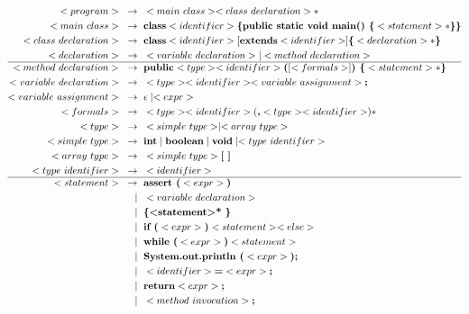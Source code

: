 \documentclass[a4paper,12pt]{article}
\newcommand{\bb}[1]{\textbf{#1}}
\newcommand{\s}{\text{ }}
\newcommand{\bracel}{\textbraceleft}
\newcommand{\bracer}{\textbraceright}
\begin{document}
\begin{align*}
<program>\s \to \s &<main\s class> <class\s declaration>* \\
<main\s class>\s \to \s &\bb{class} <identifier> \bb{\bracel public static void main() \bracel} <statement>* \bb{\bracer \bracer}\\
<class\s declaration>\s \to \s &\bb{class} <identifier> [\bb{extends} <identifier>] \bb{\bracel}<declaration>* \bb{\bracer}\\
<declaration>\s \to \s &<variable\s declaration> | <method\s declaration> \\ 
\hline
<method\s declaration>\s \to \s &\bb{public} <type> <identifier> \bb{(} [ <formals> ] \bb{) \bracel} <statement>* \bb{\bracer}\\
<variable\s declaration>\s \to \s &<type> <identifier> <variable\s assignment>\bb{;}\\
<variable\s assignment>\s \to \s &\epsilon \mid <expr>\\
<formals>\s \to \s &<type> <identifier> ( \bb{,} <type> <identifier> )*\\
<type>\s \to \s &<simple\s type> \mid <array\s type>\\
<simple\s type>\s \to \s &\bb{int} \mid \bb{boolean} \mid \bb{void} \mid <type\s identifier>\\
<array\s type>\s \to \s &<simple\s type> \bb{[ ]}\\
<type\s identifier>\s \to \s &<identifier> \\
\hline
<statement>\s \to \s &\bb{assert (} <expr> \bb{)}  \\
             \mid \s &<variable\s declaration>  \\
             \mid \s &\bb{\bracel <statement>* \bracer}  \\
             \mid \s &\bb{if (} <expr> \bb{)} <statement> <else> \\
             \mid \s &\bb{while (} <expr> \bb{)} <statement>  \\
             \mid \s &\bb{System.out.println (} <expr> \bb{);}  \\
             \mid \s &<identifier> \bb{=} <expr> \bb{;}  \\
             \mid \s &\bb{return} <expr> \bb{;}  \\
             \mid \s &<method\s invocation> \bb{;} \\

\end{align*}
\end{document}

